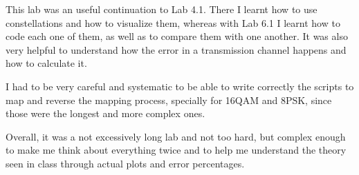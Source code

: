 \documentclass[a4paper,11pt]{article}
\begin{document}
This lab was an useful continuation to Lab 4.1. There I learnt how to use
constellations and how to visualize them, whereas with Lab 6.1 I learnt how
to code each one of them, as well as to compare them with one another.
It was also very helpful to understand how the error in a transmission channel
happens and how to calculate it.

I had to be very careful and systematic to be able to write correctly the
scripts to map and reverse the mapping process, specially for 16QAM and
8PSK, since those were the longest and more complex ones.

Overall, it was a not excessively long lab and not too hard, but complex enough
to make me think about everything twice and to help me understand the theory
seen in class through actual plots and error percentages.

\vspace{4cm}
\end{document}
